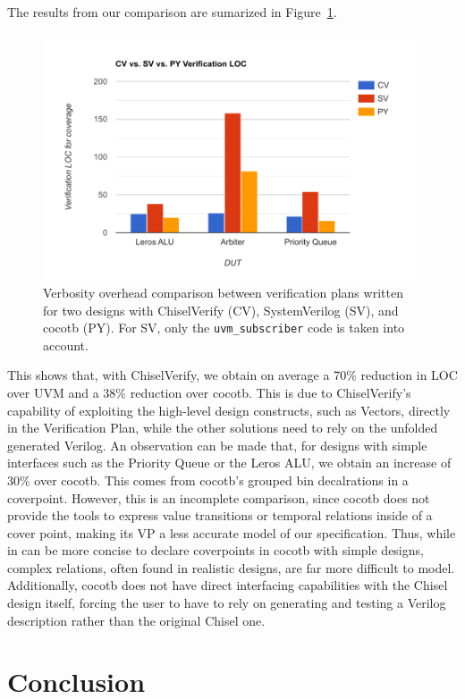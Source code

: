 \documentclass[conference]{IEEEtran}
\begin{document}
The results from our comparison are sumarized in Figure~\ref{fig:cvsvpycomp}.
\begin{figure}[h]
  \centering
  \includegraphics[trim=0.7cm 0.5cm 1cm 1cm, clip, width=.9\linewidth]{svcvpycomp.pdf}
  \caption{Verbosity overhead comparison between verification plans written for two designs with ChiselVerify (CV), SystemVerilog (SV), and cocotb (PY). For SV, only the \texttt{uvm\_subscriber} code is taken into account. }
  \label{fig:cvsvpycomp}
  \end{figure}
  This shows that, with ChiselVerify, we obtain on average a 70\% reduction in LOC over UVM and a 38\% reduction over cocotb. 
  This is due to ChiselVerify's capability of exploiting the high-level design constructs, such as Vectors, directly in the Verification Plan, while the other solutions need to rely on the unfolded generated Verilog.
  An observation can be made that, for designs with simple interfaces such as the Priority Queue or the Leros ALU, we obtain an increase of 30\% over cocotb. 
  This comes from cocotb's grouped bin decalrations in a coverpoint.
  However, this is an incomplete comparison, since cocotb does not provide the tools to express value transitions or temporal relations inside of a cover point, making its VP a less accurate model of our specification.
  Thus, while in can be more concise to declare coverpoints in cocotb with simple designs, complex relations, often found in realistic designs, are far more difficult to model.
  Additionally, cocotb does not have direct interfacing capabilities with the Chisel design itself, forcing the user to have to rely on generating and testing a Verilog description rather than the original Chisel one.

\section{Conclusion}
\label{sec:conclude}
\end{document}
